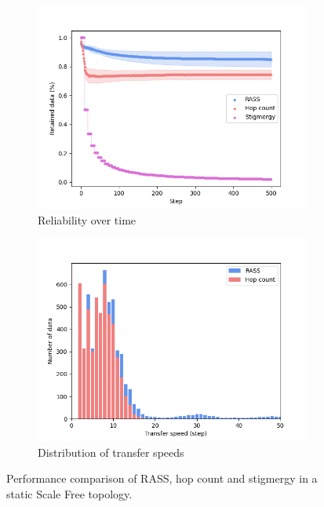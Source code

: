 \documentclass[runningheads]{llncs}
\begin{document}
\begin{figure}
    \centering
    \begin{subfigure}{0.49\textwidth}
        \includegraphics[width=\textwidth]{figures/scale_reliability.png}
        \caption{Reliability over time}
        \label{results:scale_100_reliability}
    \end{subfigure}
    \begin{subfigure}{0.49\textwidth}
        \includegraphics[width=\textwidth]{figures/scale_speed.png}
        \caption{Distribution of transfer speeds}
        \label{results:scale_100_speed}
    \end{subfigure}
    \caption{Performance comparison of RASS, hop count and stigmergy in a static Scale Free topology.}
    \label{results:staticTopologyScale}
    \vspace{-2mm}
\end{figure}
\end{document}
